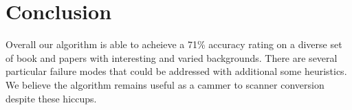 \section{Conclusion}
\label{sec:conclude}

Overall our algorithm is able to acheieve a 71\% accuracy rating on a diverse set of book and papers with interesting and varied backgrounds.
There are several particular failure modes that could be addressed with additional some heuristics.
We believe the algorithm remains useful as a cammer to scanner conversion despite these hiccups.
